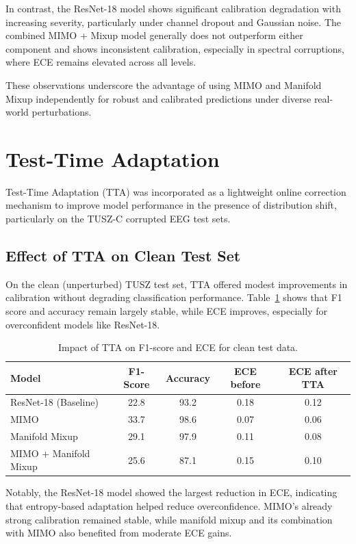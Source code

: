 In contrast, the ResNet-18 model shows significant calibration degradation with increasing severity, particularly under channel dropout and Gaussian noise. The combined MIMO + Mixup model generally does not outperform either component and shows inconsistent calibration, especially in spectral corruptions, where ECE remains elevated across all levels.

These observations underscore the advantage of using MIMO and Manifold Mixup independently for robust and calibrated predictions under diverse real-world perturbations.

\section{Test-Time Adaptation}
Test-Time Adaptation (TTA) was incorporated as a lightweight online correction mechanism to improve model performance in the presence of distribution shift, particularly on the TUSZ-C corrupted EEG test sets.
\subsection*{Effect of TTA on Clean Test Set}
On the clean (unperturbed) TUSZ test set, TTA offered modest improvements in calibration without degrading classification performance. Table~\ref{tab:tta_calibration} shows that F1 score and accuracy remain largely stable, while ECE improves, especially for overconfident models like ResNet-18.
\begin{table}[h]
\centering
\begin{tabular}{lcccc}
\toprule
Model & F1-Score & Accuracy & ECE before & ECE after TTA \\
\midrule
ResNet-18 (Baseline)     & 22.8 & 93.2 & 0.18 & 0.12 \\
MIMO                     & 33.7 & 98.6 & 0.07 & 0.06 \\
Manifold Mixup           & 29.1 & 97.9 & 0.11 & 0.08 \\
MIMO + Manifold Mixup    & 25.6 & 87.1 & 0.15 & 0.10 \\
\bottomrule
\end{tabular}
\caption[Impact of TTA on F1-score and ECE for clean test data]{Impact of TTA on F1-score and ECE for clean test data.}
\label{tab:tta_calibration}
\end{table}

Notably, the ResNet-18 model showed the largest reduction in ECE, indicating that entropy-based adaptation helped reduce overconfidence. MIMO’s already strong calibration remained stable, while manifold mixup and its combination with MIMO also benefited from moderate ECE gains.

